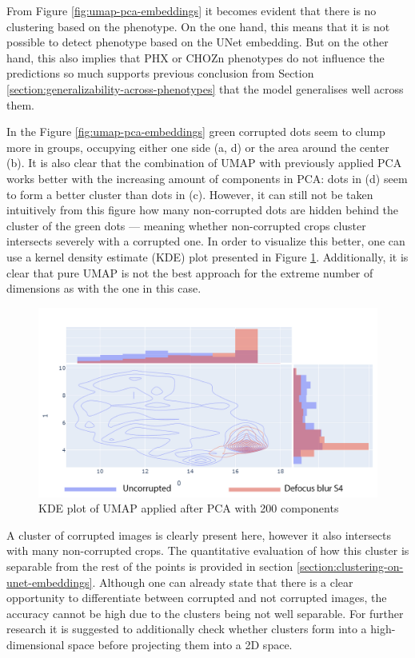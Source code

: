From Figure \ref{fig:umap-pca-embeddings} it becomes evident that there is no clustering based on the phenotype. On the one hand, this means that it is not possible to detect phenotype based on the UNet embedding. But on the other hand, this also implies that PHX or CHOZn phenotypes do not influence the predictions so much supports previous conclusion from Section \ref{section:generalizability-across-phenotypes} that the model generalises well across them. 

In the Figure \ref{fig:umap-pca-embeddings} green corrupted dots seem to clump more in groups, occupying either one side (a, d) or the area around the center (b). It is also clear that the combination of UMAP with previously applied PCA works better with the increasing amount of components in PCA: dots in (d) seem to form a better cluster than dots in (c). However, it can still not be taken intuitively from this figure how many non-corrupted dots are hidden behind the cluster of the green dots --- meaning whether non-corrupted crops cluster intersects severely with a corrupted one. In order to visualize this better, one can use a kernel density estimate (KDE) plot presented in Figure \ref{fig:kde}. Additionally, it is clear that pure UMAP is not the best approach for the extreme number of dimensions as with the one in this case.

\begin{figure}[htb]
	\begin{center}
		\includegraphics[width=0.6\linewidth]{bilder/unet-embeddings/kde.png}
	\caption{KDE plot of UMAP applied after PCA with 200 components}\label{fig:kde}
	\end{center}
\end{figure}

A cluster of corrupted images is clearly present here, however it also intersects with many non-corrupted crops. The quantitative evaluation of how this cluster is separable from the rest of the points is provided in section \ref{section:clustering-on-unet-embeddings}. Although one can already state that there is a clear opportunity to differentiate between corrupted and not corrupted images, the accuracy cannot be high due to the clusters being not well separable. For further research it is suggested to additionally check whether clusters form into a high-dimensional space before projecting them into a 2D space. 

